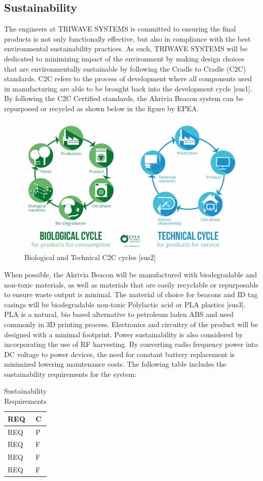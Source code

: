 \subsection{Sustainability}
\bigskip
The engineers at TRIWAVE SYSTEMS is committed to ensuring the final products is not only functionally effective, but also in compliance with the best environmental sustainability practices. As such, TRIWAVE SYSTEMS will be dedicated to minimizing impact of the environment by making design choices that are environmentally sustainable by following the Cradle to Cradle (C2C) standards. C2C refers to the process of development where all components used in manufacturing are able to be brought back into the development cycle [sus1]. By following the C2C Certified standards, the Akrivia Beacon system can be repurposed or recycled as shown below in the figure by EPEA.
\begin{figure}[H]
\centering
    \includegraphics[scale=0.70]{./images/BioTechCycle.png}
    \caption{Biological and Technical C2C cycles [sus2]}
\end{figure}

When possible, the Akrivia Beacon will be manufactured with biodegradable and non-toxic materials, as well as materials that are easily recyclable or repurposable to ensure waste output is minimal. The material of choice for beacons and ID tag casings will be biodegradable non-toxic Polylactic acid or PLA plastics [sus3]. PLA is a natural, bio based alternative to petroleum laden ABS and used commonly in 3D printing process. Electronics and circuitry of the product will be designed with a minimal footprint. Power sustainability is also considered by incorporating the use of RF harvesting. By converting radio frequency power into DC voltage to power devices, the need for constant battery replacement is minimized lowering maintenance costs. The following table includes the sustainability requirements for the system:

\bgroup
\def\arraystretch{1.5}
\begin{table}[H]
\centering
\begin{tabular}{ | m{3cm} | m{13cm}| } 
\hline
REQ & C\\ 
\hline
REQ & P\\ 
\hline
REQ & F\\  
\hline
REQ & F\\ 
\hline
REQ & F\\ 
\hline
\end{tabular}
\caption{Sustainability Requirements}
\end{table}	


%